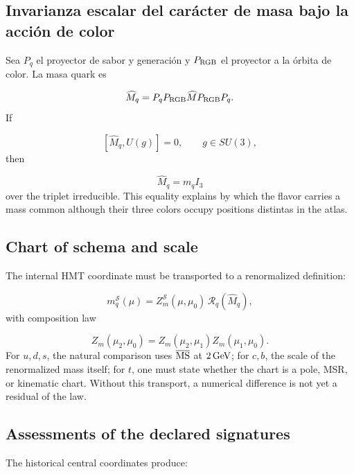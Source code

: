 \subsection{Invarianza escalar del carácter de masa bajo la acción de color}
Sea \(P_q\) el proyector de sabor y generación y \(P_{\rm RGB}\) el proyector a la órbita de color. La masa quark es

\[
 \widehat M_q=
 P_qP_{\rm RGB}\widehat M P_{\rm RGB}P_q.
\]
If

\[
 [\widehat M_q,U(g)]=0,\qquad g\in SU(3),
\]
then

\[
 \widehat M_q=m_qI_3
\]
over the triplet irreducible. This equality explains by which the flavor carries a mass common although their three colors occupy positions distintas in the atlas.

\subsection{Chart of schema and scale}
The internal HMT coordinate must be transported to a renormalized definition:

\[
 m_q^{\mathcal S}(\mu)
 =Z_m^{\mathcal S}(\mu,\mu_0)\,
 \mathcal R_q(\widehat M_q),
\]
with composition law

\[
 Z_m(\mu_2,\mu_0)
 =Z_m(\mu_2,\mu_1)Z_m(\mu_1,\mu_0).
\]
For \(u,d,s\), the natural comparison uses \(\overline{\rm MS}\) at \(2\,{\rm GeV}\); for \(c,b\), the scale of the renormalized mass itself; for \(t\), one must state whether the chart is a pole, MSR, or kinematic chart. Without this transport, a numerical difference is not yet a residual of the law.

\subsection{Assessments of the declared signatures}
The historical central coordinates produce:

